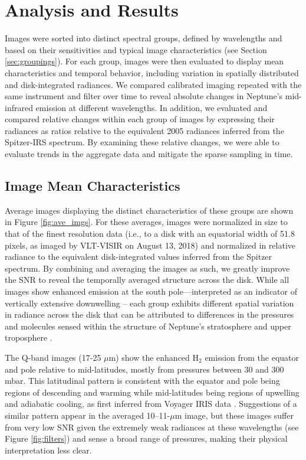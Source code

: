 \documentclass[twocolumn,10pt]{aastex631}
\begin{document}
\section{Analysis and Results}\label{sec:analysisresults}
Images were sorted into distinct spectral groups, defined by wavelengths and based on their sensitivities and typical image characteristics (see Section \ref{sec:groupings}). For each group, images were then evaluated to display mean characteristics and temporal behavior, including variation in spatially distributed and disk-integrated radiances. We compared calibrated imaging repeated with the same instrument and filter over time to reveal absolute changes in Neptune's mid-infrared emission at different wavelengths.  In addition, we evaluated and compared relative changes within each group of images by expressing their radiances as ratios relative to the equivalent 2005 radiances inferred from the Spitzer-IRS spectrum.  By examining these relative changes, we were able to evaluate trends in the aggregate data and mitigate the sparse sampling in time.  

\subsection{Image Mean Characteristics}\label{sec:meanimges}
Average images displaying the distinct characteristics of these groups are shown in Figure \ref{fig:ave_imgs}.  For these averages, images were normalized in size to that of the finest resolution data (i.e., to a disk with an equatorial width of 51.8 pixels, as imaged by VLT-VISIR on August 13, 2018) and normalized in relative radiance to the equivalent disk-integrated values inferred from the Spitzer spectrum. By combining and averaging the images as such, we greatly improve the SNR to reveal the temporally averaged structure across the disk.  While all images show enhanced emission at the south pole---interpreted as an indicator of vertically extensive downwelling \citep{dePater2014neptune}-- each group exhibits different spatial variation in radiance across the disk that can be attributed to differences in the pressures and molecules sensed within the structure of Neptune's stratosphere and upper troposphere \citep[\textit{e.g.},][]{hammel2006mid, hammel2007distribution,orton2007evidence, fletcher2014neptune, dePater2014neptune, sinclair2020spatial}. 

The Q-band images (17-25 $\mu$m) show the enhanced H$_2$ emission from the equator and pole relative to mid-latitudes, mostly from pressures between 30 and 300 mbar. This latitudinal pattern is consistent with the equator and pole being regions of descending and warming while mid-latitudes being regions of upwelling and adiabatic cooling, as first inferred from Voyager IRIS data \citep{conrath1990temperature,fletcher2014neptune}. Suggestions of a similar pattern appear in the averaged 10--11-$\mu$m image, but these images suffer from very low SNR given the extremely weak radiances at these wavelengths (see Figure \ref{fig:filters}) and sense a broad range of pressures, making their physical interpretation less clear.
\end{document}
